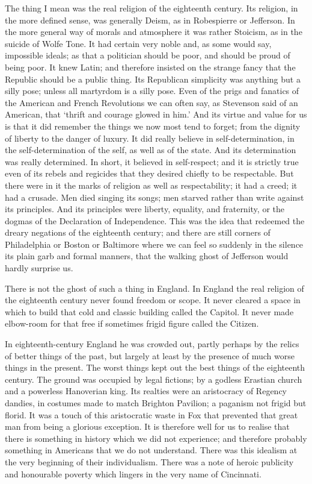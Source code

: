 \documentclass{book}
\begin{document}
The thing I mean was the real religion of the eighteenth century. Its religion, in the more defined sense, was generally Deism, as in Robespierre or Jefferson. In the more general way of morals and atmosphere it was rather Stoicism, as in the suicide of Wolfe Tone. It had certain very noble and, as some would say, impossible ideals; as that a politician should be poor, and should be proud of being poor. It knew Latin; and therefore insisted on the strange fancy that the Republic should be a public thing. Its Republican simplicity was anything but a silly pose; unless all martyrdom is a silly pose. Even of the prigs and fanatics of the American and French Revolutions we can often say, as Stevenson said of an American, that ‘thrift and courage glowed in him.’ And its virtue and value for us is that it did remember the things we now most tend to forget; from the dignity of liberty to the danger of luxury. It did really believe in self-determination, in the self-determination of the self, as well as of the state. And its determination was really determined. In short, it believed in self-respect; and it is strictly true even of its rebels and regicides that they desired chiefly to be respectable. But there were in it the marks of religion as well as respectability; it had a creed; it had a crusade. Men died singing its songs; men starved rather than write against its principles. And its principles were liberty, equality, and fraternity, or the dogmas of the Declaration of Independence. This was the idea that redeemed the dreary negations of the eighteenth century; and there are still corners of Philadelphia or Boston or Baltimore where we can feel so suddenly in the silence its plain garb and formal manners, that the walking ghost of Jefferson would hardly surprise us.

There is not the ghost of such a thing in England. In England the real religion of the eighteenth century never found freedom or scope. It never cleared a space in which to build that cold and classic building called the Capitol. It never made elbow-room for that free if sometimes frigid figure called the Citizen.

In eighteenth-century England he was crowded out, partly perhaps by the relics of better things of the past, but largely at least by the presence of much worse things in the present. The worst things kept out the best things of the eighteenth century. The ground was occupied by legal fictions; by a godless Erastian church and a powerless Hanoverian king. Its realties were an aristocracy of Regency dandies, in costumes made to match Brighton Pavilion; a paganism not frigid but florid. It was a touch of this aristocratic waste in Fox that prevented that great man from being a glorious exception. It is therefore well for us to realise that there is something in history which we did not experience; and therefore probably something in Americans that we do not understand. There was this idealism at the very beginning of their individualism. There was a note of heroic publicity and honourable poverty which lingers in the very name of Cincinnati.
\end{document}
